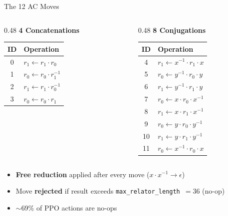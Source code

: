 \documentclass[aspectratio=169,11pt]{beamer}
\newcommand{\inv}[1]{#1^{-1}}
\begin{document}
\begin{frame}{The 12 AC Moves}
  \small
  \begin{columns}[T]
    \begin{column}{0.48\textwidth}
      \textbf{4 Concatenations}
      \begin{tabular}{cl}
        \toprule
        \textbf{ID} & \textbf{Operation} \\
        \midrule
        0 & $r_1 \leftarrow r_1 \cdot r_0$ \\
        1 & $r_0 \leftarrow r_0 \cdot \inv{r_1}$ \\
        2 & $r_1 \leftarrow r_1 \cdot \inv{r_0}$ \\
        3 & $r_0 \leftarrow r_0 \cdot r_1$ \\
        \bottomrule
      \end{tabular}
    \end{column}
    \begin{column}{0.48\textwidth}
      \textbf{8 Conjugations}
      \begin{tabular}{cl}
        \toprule
        \textbf{ID} & \textbf{Operation} \\
        \midrule
        4  & $r_1 \leftarrow \inv{x} \cdot r_1 \cdot x$ \\
        5  & $r_0 \leftarrow \inv{y} \cdot r_0 \cdot y$ \\
        6  & $r_1 \leftarrow \inv{y} \cdot r_1 \cdot y$ \\
        7  & $r_0 \leftarrow x \cdot r_0 \cdot \inv{x}$ \\
        8  & $r_1 \leftarrow x \cdot r_1 \cdot \inv{x}$ \\
        9  & $r_0 \leftarrow y \cdot r_0 \cdot \inv{y}$ \\
        10 & $r_1 \leftarrow y \cdot r_1 \cdot \inv{y}$ \\
        11 & $r_0 \leftarrow \inv{x} \cdot r_0 \cdot x$ \\
        \bottomrule
      \end{tabular}
    \end{column}
  \end{columns}

  \bigskip
  \begin{itemize}
    \item \textbf{Free reduction} applied after every move ($x \cdot \inv{x} \to \epsilon$)
    \item Move \textbf{rejected} if result exceeds \texttt{max\_relator\_length}~$= 36$ (no-op)
    \item $\sim$69\% of PPO actions are no-ops
  \end{itemize}
\end{frame}
\end{document}
